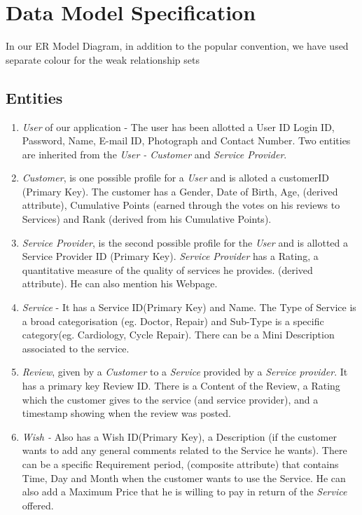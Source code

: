 \documentclass[a4paper]{article}
\begin{document}
\section{Data Model Specification}

In our ER Model Diagram, in addition to the popular convention, we have used separate colour for the weak relationship sets 

\subsection{Entities}

\begin{enumerate}
\item \textit{User} of our application - The user has been allotted a User ID
Login ID, Password, Name, E-mail ID, Photograph and Contact Number. Two entities are inherited from the \textit{User - Customer} and \textit{Service Provider}.
\item \textit{Customer}, is one possible profile for a \textit{User} and is alloted a customerID (Primary Key). The customer has a Gender, Date of Birth, Age, (derived attribute), Cumulative Points (earned through the votes on his reviews to Services) and Rank (derived from his Cumulative Points).

\item \textit{Service Provider}, is the second possible profile for the \textit{User} and is allotted a Service Provider ID (Primary Key). \textit{Service Provider} has a Rating, a quantitative measure of the quality of services he provides. (derived attribute). He can also mention his Webpage.
 
\item \textit{Service} - It has a Service ID(Primary Key) and Name. The Type of Service is a broad categorisation (eg. Doctor, Repair) and Sub-Type is a specific category(eg. Cardiology, Cycle Repair). There can be a Mini Description associated to the service.

\item \textit{Review}, given by a \textit{Customer} to a \textit{Service} provided by a \textit{Service provider}. It has a primary key Review ID. There is a Content of the Review, a Rating which the customer gives to the service (and service provider), and a timestamp showing when the review was posted.

\item \textit{Wish -} Also has a Wish ID(Primary Key), a Description (if the customer wants to add any general comments related to the Service he wants). There can be a specific Requirement period, (composite attribute) that contains Time, Day and Month when the customer wants to use the Service. He can also add a Maximum Price that he is willing to pay in return of the \textit{Service} offered.


\end{enumerate}
\end{document}
